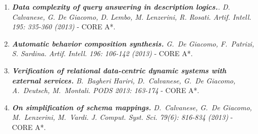 \begin{enumerate}[topsep=0pt,itemsep=-1ex,partopsep=1ex,parsep=1ex]
\item \textit{\textbf{Data complexity of query answering in description logics.}. D. Calvanese, G. De Giacomo, D. Lembo, M. Lenzerini, R. Rosati.
Artif. Intell. 195: 335-360 (2013)} - CORE  A*. %



\item
\textit{\textbf{Automatic behavior composition synthesis.} G.\ De Giacomo,  F.\ Patrizi, S. Sardina. Artif. Intell. 196: 106-142 (2013)} - CORE  A*. %


\item \textit{\textbf{Verification of relational data-centric dynamic systems with external services.}
B.\ Bagheri Hariri, D.\ Calvanese, G.\ De Giacomo, A.\ Deutsch, M.\ Montali. PODS 2013: 163-174} - CORE  A*. %




\item \textit{\textbf{On simplification of schema mappings.} D.\ Calvanese, G.\ De Giacomo, M.\ Lenzerini, M.\ Vardi.  J. Comput. Syst. Sci. 79(6): 816-834 (2013)} - CORE  A*. %



\end{enumerate}
